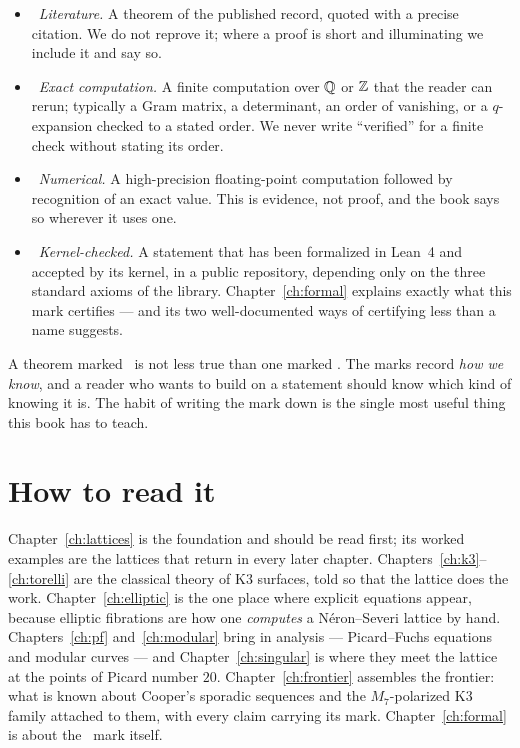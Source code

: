 \begin{itemize}[leftmargin=2em]
\item \Lstatus\ \emph{Literature.} A theorem of the published record, quoted
  with a precise citation. We do not reprove it; where a proof is short and
  illuminating we include it and say so.
\item \Estatus\ \emph{Exact computation.} A finite computation over $\mathbb{Q}$ or
  $\mathbb{Z}$ that the reader can rerun; typically a Gram matrix, a determinant, an
  order of vanishing, or a $q$-expansion checked to a stated order. We never
  write ``verified'' for a finite check without stating its order.
\item \Nstatus\ \emph{Numerical.} A high-precision floating-point computation
  followed by recognition of an exact value. This is evidence, not proof, and
  the book says so wherever it uses one.
\item \Kstatus\ \emph{Kernel-checked.} A statement that has been formalized
  in Lean~4 and accepted by its kernel, in a public repository, depending only
  on the three standard axioms of the library. Chapter~\ref{ch:formal}
  explains exactly what this mark certifies --- and its two well-documented
  ways of certifying less than a name suggests.
\end{itemize}

A theorem marked \Lstatus\ is not less true than one marked \Kstatus. The
marks record \emph{how we know}, and a reader who wants to build on a
statement should know which kind of knowing it is. The habit of writing the
mark down is the single most useful thing this book has to teach.

\section*{How to read it}

Chapter~\ref{ch:lattices} is the foundation and should be read first; its
worked examples are the lattices that return in every later chapter.
Chapters~\ref{ch:k3}--\ref{ch:torelli} are the classical theory of K3
surfaces, told so that the lattice does the work. Chapter~\ref{ch:elliptic}
is the one place where explicit equations appear, because elliptic fibrations
are how one \emph{computes} a N\'eron--Severi lattice by hand.
Chapters~\ref{ch:pf} and~\ref{ch:modular} bring in analysis --- Picard--Fuchs
equations and modular curves --- and Chapter~\ref{ch:singular} is where they
meet the lattice at the points of Picard number $20$. Chapter~\ref{ch:frontier}
assembles the frontier: what is known about Cooper's sporadic sequences and
the $M_7$-polarized K3 family attached to them, with every claim carrying its
mark. Chapter~\ref{ch:formal} is about the \Kstatus\ mark itself.

